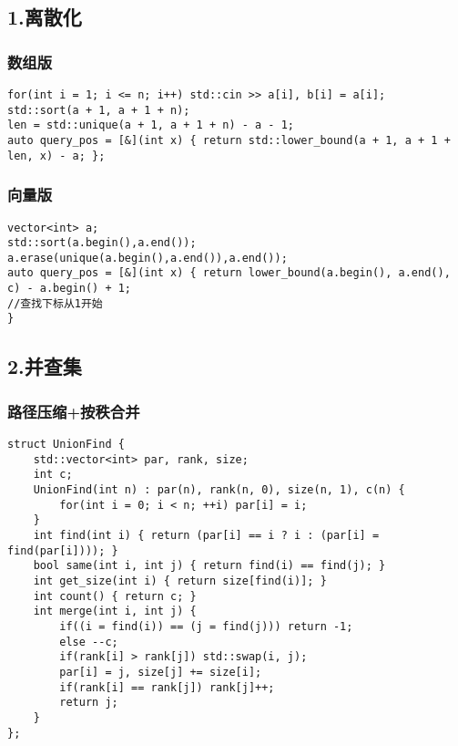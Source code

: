 \documentclass[]{article}
\begin{document}
\hypertarget{ux79bbux6563ux5316}{%
\subsection{1.离散化}\label{ux79bbux6563ux5316}}

\hypertarget{ux6570ux7ec4ux7248}{%
\subsubsection{数组版}\label{ux6570ux7ec4ux7248}}

\begin{verbatim}
for(int i = 1; i <= n; i++) std::cin >> a[i], b[i] = a[i];
std::sort(a + 1, a + 1 + n);
len = std::unique(a + 1, a + 1 + n) - a - 1;
auto query_pos = [&](int x) { return std::lower_bound(a + 1, a + 1 + len, x) - a; };
\end{verbatim}

\hypertarget{ux5411ux91cfux7248}{%
\subsubsection{向量版}\label{ux5411ux91cfux7248}}

\begin{verbatim}
vector<int> a;
std::sort(a.begin(),a.end());
a.erase(unique(a.begin(),a.end()),a.end());
auto query_pos = [&](int x) { return lower_bound(a.begin(), a.end(), c) - a.begin() + 1;  
//查找下标从1开始
}
\end{verbatim}

\hypertarget{ux5e76ux67e5ux96c6}{%
\subsection{2.并查集}\label{ux5e76ux67e5ux96c6}}

\hypertarget{ux8defux5f84ux538bux7f29ux6309ux79e9ux5408ux5e76}{%
\subsubsection{路径压缩+按秩合并}\label{ux8defux5f84ux538bux7f29ux6309ux79e9ux5408ux5e76}}

\begin{verbatim}
struct UnionFind {
    std::vector<int> par, rank, size;
    int c;
    UnionFind(int n) : par(n), rank(n, 0), size(n, 1), c(n) {
        for(int i = 0; i < n; ++i) par[i] = i;
    }
    int find(int i) { return (par[i] == i ? i : (par[i] = find(par[i]))); }
    bool same(int i, int j) { return find(i) == find(j); }
    int get_size(int i) { return size[find(i)]; }
    int count() { return c; }
    int merge(int i, int j) {
        if((i = find(i)) == (j = find(j))) return -1;
        else --c;
        if(rank[i] > rank[j]) std::swap(i, j);
        par[i] = j, size[j] += size[i];
        if(rank[i] == rank[j]) rank[j]++;
        return j;
    }
};
\end{verbatim}
\end{document}

